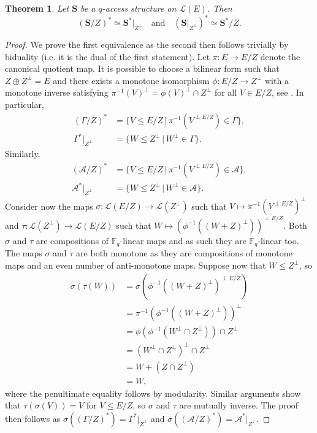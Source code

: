 \documentclass[onecolumn,draftclsnofoot,12pt]{IEEEtran}
\newcommand{\F}{\mathbb{F}}
\newcommand{\A}{\mathcal{A}}
\theoremstyle{plain} %
\newtheorem{theorem}{Theorem}
\theoremstyle{definition}
\begin{document}
 \begin{theorem} \label{thm:minors}
Let $\mathbf{S}$ be a $q$-access structure on $\mathcal{L}(E)$. Then
\[
    (\mathbf{S}/Z)^* \simeq \mathbf{S}^*|_{Z^{\perp}} \quad \text{and} \quad(\mathbf{S}| _{Z^{\perp}})^* \simeq \mathbf{S}^*/Z.
\]
\end{theorem}
\begin{proof} We prove the first equivalence as the second then follows trivially by biduality (i.e. it is the dual of the first statement). Let $\pi\colon E \rightarrow E/Z$ denote the canonical quotient map. It is possible to choose a bilinear form such that $Z\oplus Z^{\perp} = E$ and there exists a monotone isomorphism $\phi\colon E/Z\rightarrow Z^{\perp}$ with a monotone inverse satisfying $\pi^{-1}(V)^{\perp} = \phi(V)^{\perp} \cap Z^{\perp}$ for all $V\in E/Z$, see \cite[Theorem 5.3]{DBLP:journals/corr/abs-2104-06570}. In particular,
\begin{align*}
    (\Gamma/Z)^* &= \{V\leq E/Z\,|\, \pi^{-1}(V^{\perp E/Z}) \in \Gamma \},\\
    \Gamma^*|_{Z^{\perp}} &= \{ W\leq Z^\perp \, |\, W^{\perp}\in \Gamma\}.
\end{align*}
Similarly. 
\begin{align*}
    (\A/Z)^* &= \{V\leq E/Z\,|\, \pi^{-1}(V^{\perp E/Z}) \in \A \},\\
    \A^*|_{Z^{\perp}} &= \{ W\leq Z^\perp  \, |\, W^{\perp}\in \A\}.
\end{align*} Consider now the maps $\sigma\colon \mathcal{L}(E/Z) \rightarrow \mathcal{L}(Z^{\perp})$ such that $V\mapsto \pi^{-1}(V^{\perp E/Z})^{\perp}$
and $\tau \colon \mathcal{L}(Z^{\perp})\rightarrow \mathcal{L}(E/Z)$ such that $W\mapsto (\phi^{-1}((W+Z)^{\perp}))^{\perp E/Z}$. Both $\sigma$ and $\tau$ are compositions of $\F_q$-linear maps and as such they are $\F_q$-linear too. The maps $\sigma$ and $\tau$ are both monotone as they are compositions of monotone maps and an even number of anti-monotone maps. Suppose now that $W\leq Z^\perp$, so
\begin{align*}
    \sigma ( \tau (W)) &= \sigma ( \phi^{-1}((W+Z)^\perp)^{\perp E/Z}) \\
    &= \pi^{-1}(\phi^{-1}((W+Z)^\perp))^\perp \\
    &= \phi(\phi^{-1}(W^\perp \cap Z^\perp))\cap Z^\perp \\
    &= (W^\perp \cap Z^\perp)^\perp \cap Z^\perp \\
    &= W + (Z\cap Z^\perp) \\ 
    &= W,
\end{align*}
where the penultimate equality follows by modularity. Similar arguments show that $\tau(\sigma(V)) = V$ for $V\leq E/Z$, so $\sigma$ and $\tau$ are mutually inverse. The proof then follows as $\sigma((\Gamma/Z)^*) = \Gamma^*|_{Z^{\perp}}$ and $\sigma((\mathcal{A}/Z)^*) = \mathcal{A}^*|_{Z^{\perp}}$.
\end{proof}
\end{document}
